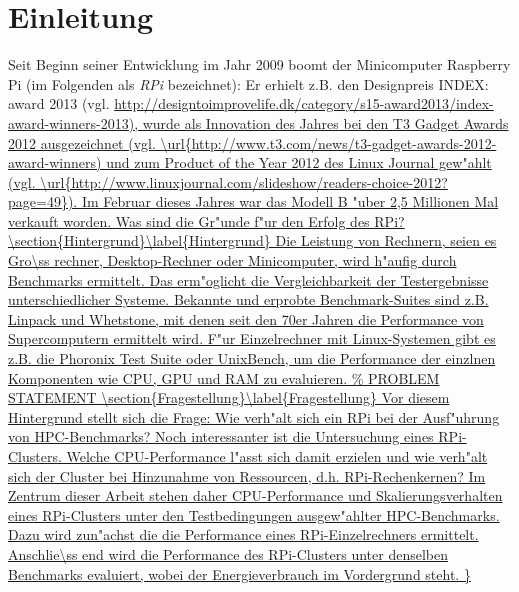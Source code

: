 \chapter{Einleitung}\label{Kapitel 1}


Seit Beginn seiner Entwicklung im Jahr 2009 boomt der Minicomputer Raspberry Pi (im Folgenden als \textit{RPi} bezeichnet): Er erhielt z.B. den Designpreis INDEX: award 2013 (vgl. \url{http://designtoimprovelife.dk/category/s15-award2013/index-award-winners-2013), wurde als Innovation des Jahres bei den T3 Gadget Awards 2012 ausgezeichnet (vgl. \url{http://www.t3.com/news/t3-gadget-awards-2012-award-winners)
und zum Product of the Year 2012 des Linux Journal gew"ahlt (vgl. \url{http://www.linuxjournal.com/slideshow/readers-choice-2012?page=49}).

Im Februar dieses Jahres war das Modell B "uber 2,5 Millionen Mal verkauft worden. Was sind die Gr"unde f"ur den Erfolg des RPi? 

\section{Hintergrund}\label{Hintergrund}

Die Leistung von Rechnern, seien es Gro\ss rechner, Desktop-Rechner oder Minicomputer, wird h"aufig durch Benchmarks ermittelt. Das erm"oglicht die Vergleichbarkeit der Testergebnisse unterschiedlicher Systeme. Bekannte und erprobte Benchmark-Suites sind z.B. Linpack und Whetstone, mit denen seit den 70er Jahren die Performance von Supercomputern ermittelt wird. F"ur Einzelrechner mit Linux-Systemen gibt es z.B. die Phoronix Test Suite oder UnixBench, um die Performance der einzlnen Komponenten wie CPU, GPU und RAM zu evaluieren. 

\section{Fragestellung}\label{Fragestellung}

Vor diesem Hintergrund stellt sich die Frage: Wie verh"alt sich ein RPi bei der Ausf"uhrung von HPC-Benchmarks? Noch interessanter ist die Untersuchung eines RPi-Clusters. Welche CPU-Performance l"asst sich damit erzielen und wie verh"alt sich der Cluster bei Hinzunahme von Ressourcen, d.h. RPi-Rechenkernen? Im Zentrum dieser Arbeit stehen daher CPU-Performance und Skalierungsverhalten eines RPi-Clusters unter den Testbedingungen ausgew"ahlter HPC-Benchmarks. Dazu wird zun"achst die die Performance eines RPi-Einzelrechners ermittelt. Anschlie\ss end wird die Performance des RPi-Clusters unter denselben Benchmarks evaluiert, wobei der Energieverbrauch im Vordergrund steht. 

}}
